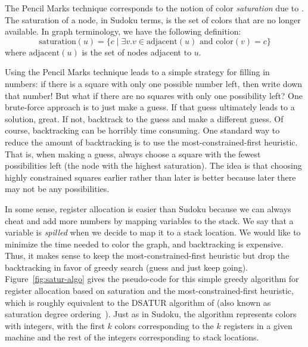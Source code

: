\documentclass[11pt]{book}
\begin{document}
The Pencil Marks technique corresponds to the notion of color
\emph{saturation} due to \cite{Brelaz:1979eu}.  The saturation of a
node, in Sudoku terms, is the set of colors that are no longer
available. In graph terminology, we have the following definition:
\begin{equation*}
  \mathrm{saturation}(u) = \{ c \;|\; \exists v. v \in \mathrm{adjacent}(u) 
     \text{ and } \mathrm{color}(v) = c \}
\end{equation*}
where $\mathrm{adjacent}(u)$ is the set of nodes adjacent to $u$.

Using the Pencil Marks technique leads to a simple strategy for
filling in numbers: if there is a square with only one possible number
left, then write down that number! But what if there are no squares
with only one possibility left? One brute-force approach is to just
make a guess. If that guess ultimately leads to a solution, great.  If
not, backtrack to the guess and make a different guess.  Of course,
backtracking can be horribly time consuming. One standard way to
reduce the amount of backtracking is to use the most-constrained-first
heuristic. That is, when making a guess, always choose a square with
the fewest possibilities left (the node with the highest saturation).
The idea is that choosing highly constrained squares earlier rather
than later is better because later there may not be any possibilities.

In some sense, register allocation is easier than Sudoku because we
can always cheat and add more numbers by mapping variables to the
stack. We say that a variable is \emph{spilled} when we decide to map
it to a stack location. We would like to minimize the time needed to
color the graph, and backtracking is expensive. Thus, it makes sense
to keep the most-constrained-first heuristic but drop the backtracking
in favor of greedy search (guess and just keep going).
Figure~\ref{fig:satur-algo} gives the pseudo-code for this simple
greedy algorithm for register allocation based on saturation and the
most-constrained-first heuristic, which is roughly equivalent to the
DSATUR algorithm of \cite{Brelaz:1979eu} (also known as saturation
degree ordering~\citep{Gebremedhin:1999fk,Omari:2006uq}).  Just
as in Sudoku, the algorithm represents colors with integers, with the
first $k$ colors corresponding to the $k$ registers in a given machine
and the rest of the integers corresponding to stack locations.
\end{document}
